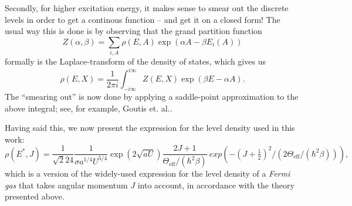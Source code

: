 Secondly, for higher excitation energy, it makes sense to smear out the discrete levels in order to get a continous function -- and get it on a closed form! The usual way this is done is by observing that the grand partition function 
\begin{equation}
Z(\alpha,\beta) = \sum_{i,A} \rho(E,A) \exp{(\alpha A - \beta E_i(A))}
\end{equation}
formally is the Laplace-transform of the density of states, which gives us
\begin{equation}
\rho(E,X) = \frac{1}{2\pi i} \int_{-i\infty}^{i\infty} Z(E,X)\exp{(\beta E - \alpha A)}.
\end{equation} 
The ``smearing out'' is now done by applying a saddle-point approximation to the above integral; see, for example,  Goutis et. al.\cite{saddle1999}.

Having said this, we now present the expression for the level density used in this work:
\begin{equation}
\rho(E^*,J) = \frac{1}{\sqrt{2}24}
\frac{1}{\sigma a^{1/4} U^{5/4}} \exp{(2\sqrt{aU})}
\frac{2J+1}{\Theta_\text{eff}/(\hbar^2\beta)}\ exp{\left(-(J+\tfrac{1}{2})^2/(2\Theta_\text{eff}/(\hbar^2\beta))\right)},\label{eq:rho}
\end{equation}
which is a version of the widely-used expression for the level density of a \emph{Fermi gas} that takes angular momentum $J$ into account, in accordance with the theory presented above\cite{ripl:2006}. 

